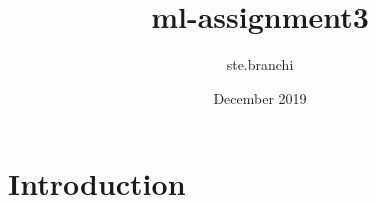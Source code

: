 \documentclass{article}
\title{ml-assignment3}
\author{ste.branchi }
\date{December 2019}
\begin{document}
\maketitle

\section{Introduction}
\end{document}
